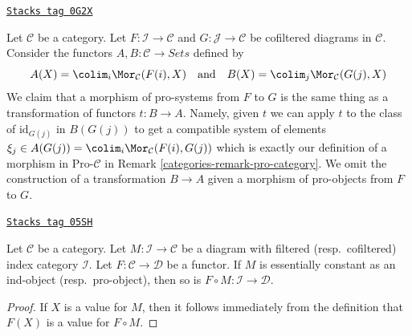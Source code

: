 \begin{remark}
\label{categories-remark-pro-category-copresheaves}
\href{https://stacks.math.columbia.edu/tag/0G2X}{\texttt{Stacks tag 0G2X}}

Let $\mathcal{C}$ be a category. Let $F : \mathcal{I} \to \mathcal{C}$ and
$G : \mathcal{J} \to \mathcal{C}$ be cofiltered diagrams in $\mathcal{C}$.
Consider the functors $A, B : \mathcal{C} \to \textit{Sets}$ defined by
$$
A(X) = \colim_i \Mor_\mathcal{C}(F(i), X)
\quad\text{and}\quad
B(X) = \colim_j \Mor_\mathcal{C}(G(j), X)
$$
We claim that a morphism of pro-systems from $F$ to $G$ is the same thing
as a transformation of functors $t : B \to A$. Namely, given $t$
we can apply $t$ to the class of $\text{id}_{G(j)}$ in $B(G(j))$
to get a compatible system of elements
$\xi_j \in A(G(j)) = \colim_i \Mor_\mathcal{C}(F(i), G(j))$
which is exactly our definition of a morphism in $\text{Pro-}\mathcal{C}$ in
Remark \ref{categories-remark-pro-category}. We omit the construction of a
transformation $B \to A$ given a morphism of pro-objects from $F$ to $G$.
\end{remark}

\begin{lemma}
\label{categories-lemma-image-essentially-constant}
\href{https://stacks.math.columbia.edu/tag/05SH}{\texttt{Stacks tag 05SH}}

Let $\mathcal{C}$ be a category. Let $M : \mathcal{I} \to \mathcal{C}$
be a diagram with filtered (resp.\ cofiltered) index category $\mathcal{I}$.
Let $F : \mathcal{C} \to \mathcal{D}$ be a functor.
If $M$ is essentially constant as an ind-object (resp.\ pro-object),
then so is $F \circ M : \mathcal{I} \to \mathcal{D}$.
\end{lemma}

\begin{proof}
If $X$ is a value for $M$, then it follows immediately from the
definition that $F(X)$ is a value for $F \circ M$.
\end{proof}

